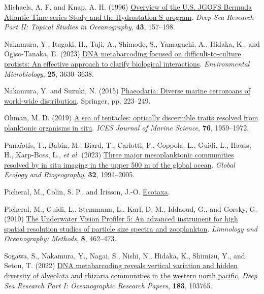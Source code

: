 \documentclass[
]{article}
\newlength{\cslhangindent}
\newlength{\cslentryspacingunit} %
\newenvironment{CSLReferences}[2] %
 {%
  \setlength{\parindent}{0pt}
  \ifodd #1
  \let\oldpar\par
  \def\par{\hangindent=\cslhangindent\oldpar}
  \fi
  \setlength{\parskip}{#2\cslentryspacingunit}
 }%
 {}
\begin{document}
\begin{CSLReferences}{1}{0}
\leavevmode{}%
Michaels, A. F. and Knap, A. H. (1996)
\href{https://doi.org/10.1016/0967-0645(96)00004-5}{Overview of the U.S.
JGOFS Bermuda Atlantic Time-series Study and the Hydrostation S
program}. \emph{Deep Sea Research Part II: Topical Studies in
Oceanography}, \textbf{43}, 157--198.

\leavevmode{}%
Nakamura, Y., Itagaki, H., Tuji, A., Shimode, S., Yamaguchi, A., Hidaka,
K., and Ogiso-Tanaka, E. (2023)
\href{https://doi.org/10.1111/1462-2920.16524}{DNA metabarcoding focused
on difficult-to-culture protists: An effective approach to clarify
biological interactions}. \emph{Environmental Microbiology},
\textbf{25}, 3630--3638.

\leavevmode{}%
Nakamura, Y. and Suzuki, N. (2015)
\href{https://link.springer.com/chapter/10.1007/978-4-431-55130-0_9}{Phaeodaria:
Diverse marine cercozoans of world-wide distribution}. Springer, pp.
223--249.

\leavevmode{}%
Ohman, M. D. (2019) \href{https://doi.org/10.1093/icesjms/fsz184}{A sea
of tentacles: optically discernible traits resolved from planktonic
organisms in situ}. \emph{ICES Journal of Marine Science}, \textbf{76},
1959--1972.

\leavevmode{}%
Panaïotis, T., Babin, M., Biard, T., Carlotti, F., Coppola, L., Guidi,
L., Hauss, H., Karp-Boss, L., \emph{et al.} (2023)
\href{https://doi.org/10.1111/geb.13741}{Three major mesoplanktonic
communities resolved by in situ imaging in the upper 500 m of the global
ocean}. \emph{Global Ecology and Biogeography}, \textbf{32}, 1991--2005.

\leavevmode{}%
Picheral, M., Colin, S. P., and Irisson, J.-O.
\href{https://ecotaxa.obs-vlfr.fr/}{Ecotaxa}.

\leavevmode{}%
Picheral, M., Guidi, L., Stemmann, L., Karl, D. M., Iddaoud, G., and
Gorsky, G. (2010) \href{https://doi.org/10.4319/lom.2010.8.462}{The
Underwater Vision Profiler 5: An advanced instrument for high spatial
resolution studies of particle size spectra and zooplankton}.
\emph{Limnology and Oceanography: Methods}, \textbf{8}, 462--473.

\leavevmode{}%
Sogawa, S., Nakamura, Y., Nagai, S., Nishi, N., Hidaka, K., Shimizu, Y.,
and Setou, T. (2022)
\href{https://doi.org/10.1016/j.dsr.2022.103765}{DNA metabarcoding
reveals vertical variation and hidden diversity of alveolata and
rhizaria communities in the western north pacific}. \emph{Deep Sea
Research Part I: Oceanographic Research Papers}, \textbf{183}, 103765.


\end{CSLReferences}
\end{document}
